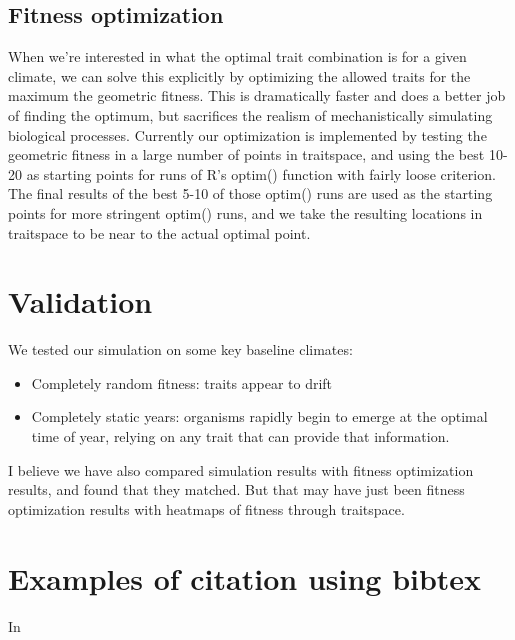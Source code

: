 \documentclass[11pt,a4paper]{article}
\begin{document}
\subsection{Fitness optimization}
When we're interested in what the optimal trait combination is for a given climate, we can solve this explicitly by optimizing the allowed traits for the maximum the geometric fitness. This is dramatically faster and does a better job of finding the optimum, but sacrifices the realism of mechanistically simulating biological processes. Currently our optimization is implemented by testing the geometric fitness in a large number of points in traitspace, and using the best 10-20 as starting points for runs of R's optim() function with fairly loose criterion. The final results of the best 5-10 of those optim() runs are used as the starting points for more stringent optim() runs, and we take the resulting locations in traitspace to be near to the actual optimal point. 

\section{Validation}
We tested our simulation on some key baseline climates:
\begin{itemize}
  \item Completely random fitness: traits appear to drift
  \item Completely static years: organisms rapidly begin to emerge at the optimal time of year, relying on any trait that can provide that information.
\end{itemize}
I believe we have also compared simulation results with fitness optimization results, and found that they matched. But that may have just been fitness optimization results with heatmaps of fitness through traitspace.

\clearpage

\section{Examples of citation using bibtex}
In 
\end{document}
